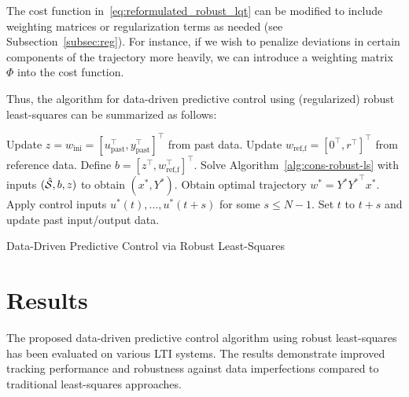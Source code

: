 \begin{Note}
    The cost function in~\eqref{eq:reformulated_robust_lqt} can be modified to include weighting matrices or regularization terms as needed (see Subsection~\ref{subsec:reg}). For instance, if we wish to penalize deviations in certain components of the trajectory more heavily, we can introduce a weighting matrix $\Phi$ into the cost function.
\end{Note}

Thus, the algorithm for data-driven predictive control using (regularized) robust least-squares can be summarized as follows:

\begin{algorithm}[H]
    \BlankLine
     {
        Update $z = w_{\textrm{ini}} = [u_{\textrm{past}}^\top, y_{\textrm{past}}^\top]^\top$ from past data.\;
        Update $w_{\textrm{ref,f}} = [0^\top, r^\top]^\top$ from reference data.\;
        Define $b = [z^\top, w_{\textrm{ref,f}}^\top]^\top$.\;
        Solve Algorithm~\ref{alg:cons-robust-ls} with inputs $(\hat{\mathcal{S}}, b, z)$ to obtain $(x^*,Y^*)$.\;
        Obtain optimal trajectory $w^* = Y^* {Y^*}^\top x^*$.\;
        Apply control inputs $u^*(t), \ldots, u^*(t+s)$ for some $s \leq N-1$.\;
        Set $t$ to $t+s$ and update past input/output data.\;
    }
    \caption{Data-Driven Predictive Control via Robust Least-Squares}
\end{algorithm}

\section{Results}
The proposed data-driven predictive control algorithm using robust least-squares has been evaluated on various LTI systems. The results demonstrate improved tracking performance and robustness against data imperfections compared to traditional least-squares approaches. 

